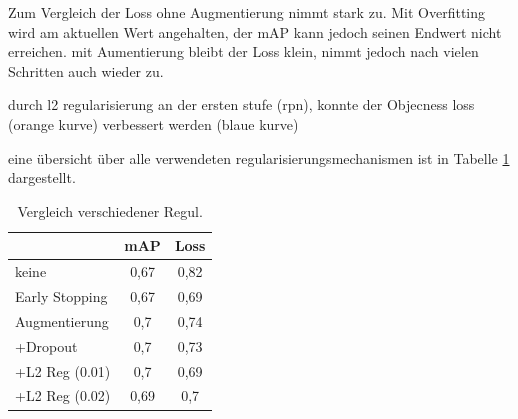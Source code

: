 Zum Vergleich der Loss ohne Augmentierung nimmt stark zu. Mit Overfitting 
wird am aktuellen Wert angehalten, der mAP kann jedoch seinen Endwert nicht 
erreichen. mit Aumentierung bleibt der Loss klein, nimmt jedoch nach
vielen Schritten auch wieder zu.


\begin{minipage}[t]{0.5\textwidth}
    \centering
    \label{fig:speed_acc}
    \def\svgwidth{0.9\textwidth}
    
\end{minipage}
\begin{minipage}[t]{0.5\textwidth}
    \centering
    \label{fig:speed_acc}
    \def\svgwidth{0.9\textwidth}
    
\end{minipage}


durch l2 regularisierung an der ersten stufe (rpn), konnte 
der Objecness loss (orange kurve) verbessert werden (blaue kurve)



\begin{minipage}[t]{0.5\textwidth}
    \centering
    \label{fig:speed_acc}
    \def\svgwidth{0.9\textwidth}
    
\end{minipage}
\begin{minipage}[t]{0.5\textwidth}
    \centering
    \label{fig:speed_acc}
    \def\svgwidth{0.9\textwidth}
    
\end{minipage}


eine übersicht über alle verwendeten regularisierungsmechanismen ist in 
Tabelle \ref{tab:overfitting} dargestellt.

\begin{table}[htb]
    \begin{tabular}{lcc}
                                                             & mAP & Loss \\ \hline
    \multicolumn{1}{l|}{keine}                               & 0,67  & 0,82   \\ \hline
    \multicolumn{1}{l|}{Early Stopping}                      & 0,67  & 0,69  \\ \hline
    \multicolumn{1}{l|}{Augmentierung}                       & 0,7 & 0,74  \\
    \multicolumn{1}{l|}{\quad +Dropout}       & 0,7 & 0,73 \\
    \multicolumn{1}{l|}{\quad +L2 Reg (0.01)} & 0,7  & 0,69  \\
    \multicolumn{1}{l|}{\quad +L2 Reg (0.02)} & 0,69 & 0,7 \\\hline
    \end{tabular}
    \label{tab:overfitting}
    \caption{Vergleich verschiedener Regul.}
\end{table}




